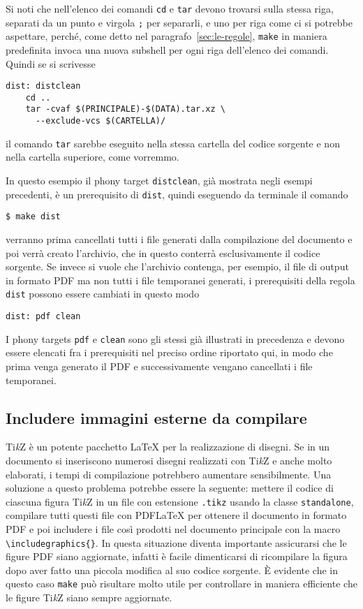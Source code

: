 Si noti che nell'elenco dei comandi \texttt{cd} e \texttt{tar} devono trovarsi
sulla stessa riga, separati da un punto e virgola \texttt{;} per separarli, e
uno per riga come ci si potrebbe aspettare, perché, come detto nel
paragrafo~\ref{sec:le-regole}, \texttt{make} in maniera predefinita invoca una
nuova subshell per ogni riga dell'elenco dei comandi.  Quindi se si scrivesse
\begin{lstlisting}
dist: distclean
	cd ..
	tar -cvaf $(PRINCIPALE)-$(DATA).tar.xz \
	  --exclude-vcs $(CARTELLA)/
\end{lstlisting} %
il comando \texttt{tar} sarebbe eseguito nella stessa cartella del codice
sorgente e non nella cartella superiore, come vorremmo.

In questo esempio il phony target \texttt{distclean}, già mostrata negli esempi
precedenti, è un prerequisito di \texttt{dist}, quindi eseguendo da terminale il
comando
\begin{verbatim}
$ make dist
\end{verbatim} %
verranno prima cancellati tutti i file generati dalla compilazione del documento
e poi verrà creato l'archivio, che in questo conterrà esclusivamente il codice
sorgente.  Se invece si vuole che l'archivio contenga, per esempio, il file di
output in formato \textsc{PDF} ma non tutti i file temporanei generati, i
prerequisiti della regola \texttt{dist} possono essere cambiati in questo modo
\begin{lstlisting}
dist: pdf clean
\end{lstlisting}
I phony targets \texttt{pdf} e \texttt{clean} sono gli stessi già illustrati in
precedenza e devono essere elencati fra i prerequisiti nel preciso ordine
riportato qui, in modo che prima venga generato il \textsc{PDF} e
successivamente vengano cancellati i file temporanei.

\subsection{Includere immagini esterne da compilare}
\label{sec:includere-immagini-esterne}

Ti\emph{k}Z è un potente pacchetto \LaTeX{}
per la realizzazione di disegni.  Se in un documento si inseriscono numerosi
disegni realizzati con Ti\emph{k}Z e anche molto elaborati, i tempi di
compilazione potrebbero aumentare sensibilmente.  Una soluzione a questo
problema potrebbe essere la seguente: mettere il codice di ciascuna figura
Ti\emph{k}Z in un file con estensione \texttt{.tikz} usando la classe
\texttt{standalone}, compilare tutti questi file con \textsc{PDF}\LaTeX{}
per ottenere il documento in formato \textsc{PDF} e poi includere i file così
prodotti nel documento principale con la macro
\texttt{\textbackslash{}includegraphics\{\}}.  In questa situazione diventa
importante assicurarsi che le figure PDF siano aggiornate, infatti è facile
dimenticarsi di ricompilare la figura dopo aver fatto una piccola modifica al
suo codice sorgente.  È evidente che in questo caso \texttt{make} può risultare
molto utile per controllare in maniera efficiente che le figure Ti\emph{k}Z
siano sempre aggiornate.


